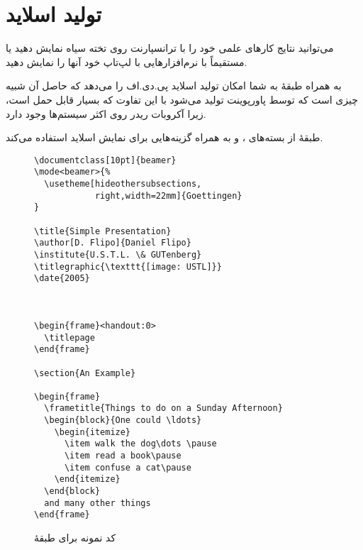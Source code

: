 \section{تولید اسلاید}
\label{sec:beamer}
می‌توانید نتایج کارهای علمی خود را با ترانسپارنت روی تخته سیاه نمایش دهید یا مستقیماً با نرم‌افزارهایی با لپ‌تاپ خود آنها را نمایش دهید.

 به همراه طبقهٔ  به شما امکان تولید اسلاید پی.دی.اف را می‌دهد که حاصل آن شبیه چیزی است که توسط پاورپوینت تولید می‌شود با این تفاوت که بسیار قابل حمل است، زیرا آکروبات ریدر روی اکثر سیستم‌ها وجود دارد.

طبقهٔ  از بسته‌های ،  و  به همراه گزینه‌هایی برای نمایش اسلاید استفاده می‌کند.



\begin{figure}[htbp]
\setLR
\begin{verbatim}
\documentclass[10pt]{beamer}
\mode<beamer>{%
  \usetheme[hideothersubsections,
            right,width=22mm]{Goettingen}
}

\title{Simple Presentation}
\author[D. Flipo]{Daniel Flipo}
\institute{U.S.T.L. \& GUTenberg}
\titlegraphic{\texttt{[image: USTL]}}
\date{2005}



\begin{frame}<handout:0>
  \titlepage
\end{frame}

\section{An Example}

\begin{frame}
  \frametitle{Things to do on a Sunday Afternoon}
  \begin{block}{One could \ldots}
    \begin{itemize}
      \item walk the dog\dots \pause
      \item read a book\pause
      \item confuse a cat\pause
    \end{itemize}
  \end{block}
  and many other things 
\end{frame}

\end{verbatim}
\setRL
  \caption{کد نمونه برای طبقهٔ  }
  \label{fig:code-beamer}
\end{figure}

